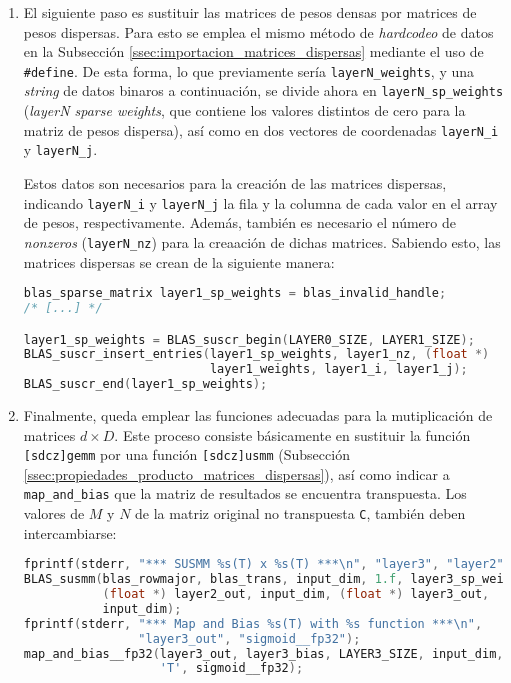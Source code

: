 \begin{enumerate}
\begin{lstlisting}[language=C]
    case 'T':
    case 't':
        for (uint32_t i = 0; i < M; i++){
            for(uint32_t j = 0; j < N; j++){
                A[i*N+j].val = map_function((fp32)(A[i*N+j].val 
                                            + bias[i].val)).val;
            }                                 // ^^^^^
        }                    // aquí se cambia el orden de acceso a bias
        break;
    }
}
\end{lstlisting}

    \item El siguiente paso es sustituir las matrices de pesos densas por matrices de pesos dispersas. Para esto se emplea el mismo método de \textit{hardcodeo} de datos en la Subsección \ref{ssec:importacion_matrices_dispersas} mediante el uso de \texttt{\#define}. De esta forma, lo que previamente sería \texttt{layerN\_weights}, y una \textit{string} de datos binaros a continuación, se divide ahora en \texttt{layerN\_sp\_weights} (\textit{layerN sparse weights}, que contiene los valores distintos de cero para la matriz de pesos dispersa), así como en dos vectores de coordenadas \texttt{layerN\_i} y \texttt{layerN\_j}.
    
    Estos datos son necesarios para la creación de las matrices dispersas, indicando \texttt{layerN\_i} y \texttt{layerN\_j} la fila y la columna de cada valor en el array de pesos, respectivamente. Además, también es necesario el número de \textit{nonzeros} (\texttt{layerN\_nz}) para la creaación de dichas matrices. Sabiendo esto, las matrices dispersas se crean de la siguiente manera:\medskip
\begin{lstlisting}[language=C]
blas_sparse_matrix layer1_sp_weights = blas_invalid_handle;
/* [...] */

layer1_sp_weights = BLAS_suscr_begin(LAYER0_SIZE, LAYER1_SIZE);
BLAS_suscr_insert_entries(layer1_sp_weights, layer1_nz, (float *)
                          layer1_weights, layer1_i, layer1_j);
BLAS_suscr_end(layer1_sp_weights);
\end{lstlisting}

    \item Finalmente, queda emplear las funciones adecuadas para la mutiplicación de matrices $d\times D$. Este proceso consiste básicamente en sustituir la función \texttt{[sdcz]gemm} por una función \texttt{[sdcz]usmm} (Subsección \ref{ssec:propiedades_producto_matrices_dispersas}), así como indicar a \texttt{map\_and\_bias} que la matriz de resultados se encuentra transpuesta. Los valores de $M$ y $N$ de la matriz original no transpuesta \texttt{C}, también deben intercambiarse:\medskip
\begin{lstlisting}[language=C]
fprintf(stderr, "*** SUSMM %s(T) x %s(T) ***\n", "layer3", "layer2");
BLAS_susmm(blas_rowmajor, blas_trans, input_dim, 1.f, layer3_sp_weights,
           (float *) layer2_out, input_dim, (float *) layer3_out,
           input_dim);
fprintf(stderr, "*** Map and Bias %s(T) with %s function ***\n",
                "layer3_out", "sigmoid__fp32");
map_and_bias__fp32(layer3_out, layer3_bias, LAYER3_SIZE, input_dim,
                   'T', sigmoid__fp32);
\end{lstlisting}
\end{enumerate}


